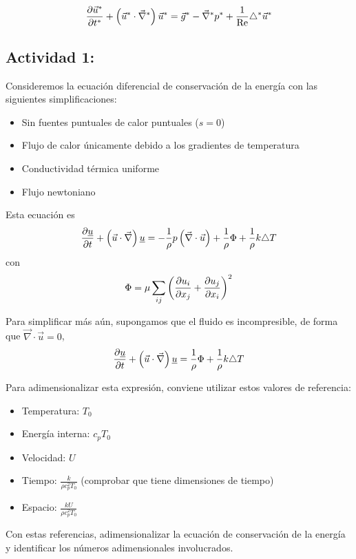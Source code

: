 		\[
		\frac{\partial \vec{u}^{\ast}}{\partial t^{\ast}}+\left(\vec{u}^{\ast}\cdot\vec{\nabla}^{\ast}\right)\vec{u}^{\ast}=\vec{g}^{\ast}-\vec{\nabla}^{\ast}p^{\ast}+\frac{1}{\text{Re}}\triangle^{\ast}\vec{u}^{\ast}
		\]
		

	
	\subsection*{Actividad 1:}
		Consideremos la ecuación diferencial de conservación de la energía
		con las siguientes simplificaciones: 
		\begin{itemize}
			\item Sin fuentes puntuales de calor puntuales ($s=0$) 
			\item Flujo de calor únicamente debido a los gradientes de temperatura 
			\item Conductividad térmica uniforme 
			\item Flujo newtoniano 
		\end{itemize}
		
		Esta ecuación es 
		\[
		\frac{\partial \underline{u}}{\partial t}+\left(\vec{u}\cdot\vec{\nabla}\right)\underline{u}=-\frac{1}{\rho}p\left(\vec{\nabla}\cdot\vec{u}\right)+\frac{1}{\rho}\Phi+\frac{1}{\rho}k\triangle T
		\]
		con 
		\[
		\Phi=\mu\sum_{ij}\left(\frac{\partial u_{i}}{\partial x_{j}}+\frac{\partial u_{j}}{\partial x_{i}}\right)^{2}
		\]
		
		Para simplificar más aún, supongamos que el fluido es incompresible,
		de forma que $\vec{\nabla}\cdot\vec{u}=0$, 
		\[
		\frac{\partial \underline{u}}{\partial t}+\left(\vec{u}\cdot\vec{\nabla}\right)\underline{u}=\frac{1}{\rho}\Phi+\frac{1}{\rho}k\triangle T
		\]
		
		
		Para adimensionalizar esta expresión, conviene utilizar estos valores
		de referencia: 
		\begin{itemize}
			\item Temperatura: $T_{0}$ 
			\item Energía interna: $c_{p}T_{0}$ 
			\item Velocidad: $U$ 
			\item Tiempo: $\frac{k}{\rho c_{p}^{2}T_{0}}$ (comprobar que tiene dimensiones
			de tiempo) 
			\item Espacio: $\frac{kU}{\rho c_{p}^{2}T_{0}}$ 
		\end{itemize}
		
		Con estas referencias, adimensionalizar la ecuación de conservación
		de la energía y identificar los números adimensionales involucrados.
		

